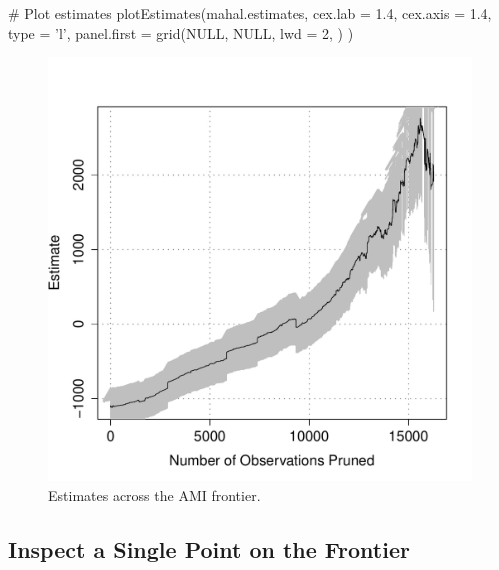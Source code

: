 \documentclass[nojss]{jss}
\begin{document}
\begin{minipage}{0.45\textwidth}
\begin{CodeChunk}
\begin{CodeInput}
# Plot estimates
plotEstimates(mahal.estimates, 
              cex.lab = 1.4,
              cex.axis = 1.4,
              type = 'l',
              panel.first = 
                 grid(NULL,
                      NULL,
                      lwd = 2,
                      )
              )
\end{CodeInput}
\end{CodeChunk}
\end{minipage}
\begin{minipage}{0.5\textwidth}
\begin{figure}[H]
\includegraphics{mahal_frontier_est.pdf}
\caption{\label{fig:mahal_frontier_est} Estimates across the AMI frontier.}
\end{figure}
\end{minipage} \hfill
\newline
\newline

\subsection{Inspect a Single Point on the Frontier}
\end{document}
